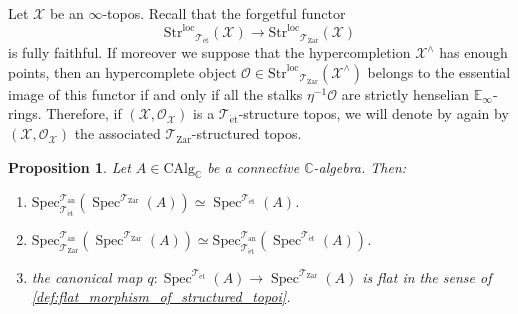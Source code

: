 \documentclass[12pt,a4paper,reqno]{amsart}
\theoremstyle{plain}
\newtheorem{prop}[thm]{Proposition}
\theoremstyle{definition}
\theoremstyle{remark}
\numberwithin{equation}{section}
\begin{document}
Let ${\mathcal X}$ be an $\infty$-topos.
Recall that the forgetful functor
\[ {\mathrm{Str}^\mathrm{loc}}_{{\mathcal T}_{\mathrm{\acute{e}t}}}({\mathcal X}) \to {\mathrm{Str}^\mathrm{loc}}_{{\mathcal T}_{\mathrm{Zar}}}({\mathcal X}) \]
is fully faithful.
If moreover we suppose that the hypercompletion ${\mathcal X}^{\wedge}$ has enough points, then an hypercomplete object ${\mathcal O} \in {\mathrm{Str}^\mathrm{loc}}_{{\mathcal T}_{\mathrm{Zar}}}({\mathcal X}^\wedge)$ belongs to the essential image of this functor if and only if all the stalks $\eta{^{-1}} {\mathcal O}$ are strictly henselian $\mathbb E_\infty$-rings.
Therefore, if $({\mathcal X}, {\mathcal O}_{\mathcal X})$ is a ${{\mathcal T}_{\mathrm{\acute{e}t}}}$-structure topos, we will denote by again by $({\mathcal X}, {\mathcal O}_{\mathcal X})$ the associated ${{\mathcal T}_{\mathrm{Zar}}}$-structured topos.

\begin{prop} \label{prop:relative_zariski_etale_spectrum}
	Let $A \in \mathrm{CAlg}_{\mathbb C}$ be a connective $\mathbb C$-algebra.
	Then:
	\begin{enumerate}
		\item $\mathrm{Spec}^{{\mathcal T}_{\mathrm{an}}}_{{\mathcal T}_{\mathrm{\acute{e}t}}}( \operatorname{Spec}^{{\mathcal T}_{\mathrm{Zar}}}(A) ) \simeq \operatorname{Spec}^{{\mathcal T}_{\mathrm{\acute{e}t}}}(A)$.
		\item $\mathrm{Spec}^{{\mathcal T}_{\mathrm{an}}}_{{\mathcal T}_{\mathrm{Zar}}} (\operatorname{Spec}^{{\mathcal T}_{\mathrm{Zar}}}(A)) \simeq \mathrm{Spec}^{{\mathcal T}_{\mathrm{an}}}_{{\mathcal T}_{\mathrm{\acute{e}t}}} (\operatorname{Spec}^{{\mathcal T}_{\mathrm{\acute{e}t}}}(A))$.
		\item the canonical map $q \colon \operatorname{Spec}^{{\mathcal T}_{\mathrm{\acute{e}t}}}(A) \to \operatorname{Spec}^{{\mathcal T}_{\mathrm{Zar}}}(A)$ is flat in the sense of \cref{def:flat_morphism_of_structured_topoi}.
	\end{enumerate}
\end{prop}
\end{document}
